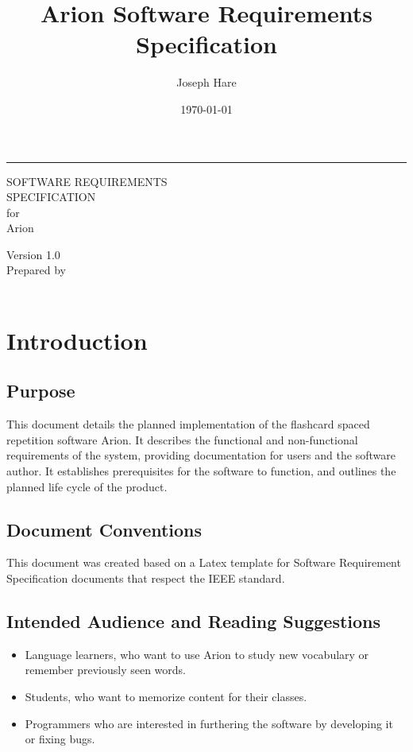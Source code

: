 \documentclass{scrreprt}
\title{Arion Software Requirements Specification}
\author{Joseph Hare}
\date{\today}
\makeatletter
\newcommand{\theauthor}{\@author}
\newcommand{\thedate}{\@date}
\newcommand{\version}{1.0 }
\newcommand{\bigspace}{\vspace{1.9cm}}
\newcommand{\smallspace}{\vspace{0.5cm}}
\makeatother
\begin{document}
\begin{flushright}
    \rule{\linewidth}{5pt}
    \vskip 1cm
    \begin{bfseries}
        \Huge
        SOFTWARE REQUIREMENTS\\
        SPECIFICATION\\
        \smallspace
        for\\
        \smallspace
        Arion\\
        \bigspace

        \LARGE
        Version \version \\
        \smallspace
        Prepared by \theauthor\\
        \smallspace
        \thedate\\
    \end{bfseries}
\end{flushright}

\tableofcontents


\chapter{Introduction}

\section{Purpose}
This document details the planned implementation of the flashcard spaced repetition software Arion.
It describes the functional and non-functional requirements of the system, providing documentation for users
and the software author.
It establishes prerequisites for the software to function, and outlines the planned life cycle of the product.

\section{Document Conventions}
This document was created based on a Latex template for Software Requirement Specification documents that
respect the IEEE standard.

\section{Intended Audience and Reading Suggestions}
\begin{itemize}
    \item Language learners, who want to use Arion to study new vocabulary or remember previously seen words.
    \item Students, who want to memorize content for their classes.
    \item Programmers who are interested in furthering the software by developing it or
fixing bugs. 
\end{itemize}
\end{document}

